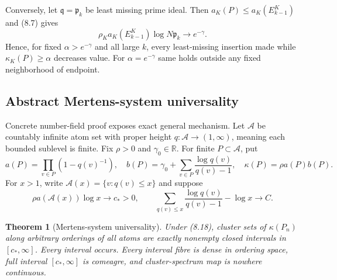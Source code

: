 \documentclass[11pt]{article}
\newtheorem{theorem}{Theorem}[section]
\theoremstyle{definition}
\theoremstyle{remark}
\newcommand{\R}{\mathbb R}
\begin{document}
Conversely, let $\mathfrak q=\mathfrak p_k$ be least missing prime ideal.  Then
$a_K(P)\leq a_K(E_{k-1}^K)$ and (8.7) gives
\begin{equation}
 \rho_Ka_K(E_{k-1}^K)\log N\mathfrak p_k\longrightarrow e^{-\gamma}.
                                                                    \tag{8.16}
\end{equation}
Hence, for fixed $\alpha>e^{-\gamma}$ and all large $k$, every least-missing insertion made while
$\kappa_K(P)\geq\alpha$ decreases value.  For $\alpha=e^{-\gamma}$ same holds outside any fixed
neighborhood of endpoint.

\subsection{Abstract Mertens-system universality}

Concrete number-field proof exposes exact general mechanism.  Let $\mathcal A$ be countably
infinite atom set with proper height $q:\mathcal A\to(1,\infty)$, meaning each bounded sublevel is
finite.  Fix $\rho>0$ and $\gamma_0\in\R$.  For finite $P\subset\mathcal A$, put
\begin{equation}
 a(P)=\prod_{v\in P}(1-q(v)^{-1}),\quad
 b(P)=\gamma_0+\sum_{v\in P}\frac{\log q(v)}{q(v)-1},\quad
 \kappa(P)=\rho a(P)b(P).                                \tag{8.17}
\end{equation}
For $x>1$, write $\mathcal A(x)=\{v:q(v)\leq x\}$ and suppose
\begin{equation}
 \rho a(\mathcal A(x))\log x\longrightarrow c_*>0,\qquad
 \sum_{q(v)\leq x}\frac{\log q(v)}{q(v)-1}-\log x
 \longrightarrow C.                                    \tag{8.18}
\end{equation}

\begin{theorem}[Mertens-system universality]
\label{thm:mertens-system}
Under (8.18), cluster sets of $\kappa(P_n)$ along arbitrary orderings of all atoms are exactly
nonempty closed intervals in $[c_*,\infty]$.  Every interval occurs.  Every interval fibre is
dense in ordering space, full interval $[c_*,\infty]$ is comeagre, and cluster-spectrum map is
nowhere continuous.
\end{theorem}
\end{document}

